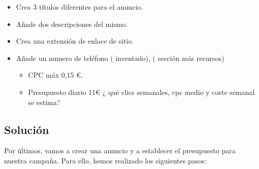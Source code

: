 \begin{itemize}
    \item Crea 3 títulos diferentes para el anuncio.
    \item Añade dos descripciones del mismo.
    \item Crea una extensión de enlace de sitio.
    \item Añade un numero de teléfono ( inventado), ( sección más recursos)

    \begin{itemize}
        \item CPC máx 0,15 €.
        \item Presupuesto diario 11€ ¿ qué clics semanales, cpc medio y coste semanal se estima?
    \end{itemize}
 \end{itemize}

\subsection{Solución}
Por últimos, vamos a crear una anuncio y a establecer el presupuesto para nuestra campaña. Para ello, hemos realizado los siguientes pasos:

